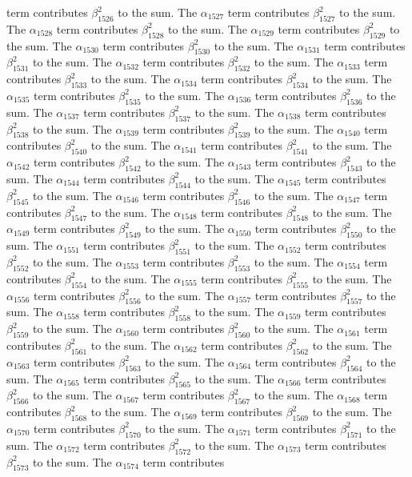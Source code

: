 \begin{lemma}
term contributes $\beta_{1526}^{2}$ to the sum. The $\alpha_{1527}$ term contributes $\beta_{1527}^{2}$ to the sum. The $\alpha_{1528}$ term contributes $\beta_{1528}^{2}$ to the sum. The $\alpha_{1529}$ term contributes $\beta_{1529}^{2}$ to the sum. The $\alpha_{1530}$ term contributes $\beta_{1530}^{2}$ to the sum. The $\alpha_{1531}$ term contributes $\beta_{1531}^{2}$ to the sum. The $\alpha_{1532}$ term contributes $\beta_{1532}^{2}$ to the sum. The $\alpha_{1533}$ term contributes $\beta_{1533}^{2}$ to the sum. The $\alpha_{1534}$ term contributes $\beta_{1534}^{2}$ to the sum. The $\alpha_{1535}$ term contributes $\beta_{1535}^{2}$ to the sum. The $\alpha_{1536}$ term contributes $\beta_{1536}^{2}$ to the sum. The $\alpha_{1537}$ term contributes $\beta_{1537}^{2}$ to the sum. The $\alpha_{1538}$ term contributes $\beta_{1538}^{2}$ to the sum. The $\alpha_{1539}$ term contributes $\beta_{1539}^{2}$ to the sum. The $\alpha_{1540}$ term contributes $\beta_{1540}^{2}$ to the sum. The $\alpha_{1541}$ term contributes $\beta_{1541}^{2}$ to the sum. The $\alpha_{1542}$ term contributes $\beta_{1542}^{2}$ to the sum. The $\alpha_{1543}$ term contributes $\beta_{1543}^{2}$ to the sum. The $\alpha_{1544}$ term contributes $\beta_{1544}^{2}$ to the sum. The $\alpha_{1545}$ term contributes $\beta_{1545}^{2}$ to the sum. The $\alpha_{1546}$ term contributes $\beta_{1546}^{2}$ to the sum. The $\alpha_{1547}$ term contributes $\beta_{1547}^{2}$ to the sum. The $\alpha_{1548}$ term contributes $\beta_{1548}^{2}$ to the sum. The $\alpha_{1549}$ term contributes $\beta_{1549}^{2}$ to the sum. The $\alpha_{1550}$ term contributes $\beta_{1550}^{2}$ to the sum. The $\alpha_{1551}$ term contributes $\beta_{1551}^{2}$ to the sum. The $\alpha_{1552}$ term contributes $\beta_{1552}^{2}$ to the sum. The $\alpha_{1553}$ term contributes $\beta_{1553}^{2}$ to the sum. The $\alpha_{1554}$ term contributes $\beta_{1554}^{2}$ to the sum. The $\alpha_{1555}$ term contributes $\beta_{1555}^{2}$ to the sum. The $\alpha_{1556}$ term contributes $\beta_{1556}^{2}$ to the sum. The $\alpha_{1557}$ term contributes $\beta_{1557}^{2}$ to the sum. The $\alpha_{1558}$ term contributes $\beta_{1558}^{2}$ to the sum. The $\alpha_{1559}$ term contributes $\beta_{1559}^{2}$ to the sum. The $\alpha_{1560}$ term contributes $\beta_{1560}^{2}$ to the sum. The $\alpha_{1561}$ term contributes $\beta_{1561}^{2}$ to the sum. The $\alpha_{1562}$ term contributes $\beta_{1562}^{2}$ to the sum. The $\alpha_{1563}$ term contributes $\beta_{1563}^{2}$ to the sum. The $\alpha_{1564}$ term contributes $\beta_{1564}^{2}$ to the sum. The $\alpha_{1565}$ term contributes $\beta_{1565}^{2}$ to the sum. The $\alpha_{1566}$ term contributes $\beta_{1566}^{2}$ to the sum. The $\alpha_{1567}$ term contributes $\beta_{1567}^{2}$ to the sum. The $\alpha_{1568}$ term contributes $\beta_{1568}^{2}$ to the sum. The $\alpha_{1569}$ term contributes $\beta_{1569}^{2}$ to the sum. The $\alpha_{1570}$ term contributes $\beta_{1570}^{2}$ to the sum. The $\alpha_{1571}$ term contributes $\beta_{1571}^{2}$ to the sum. The $\alpha_{1572}$ term contributes $\beta_{1572}^{2}$ to the sum. The $\alpha_{1573}$ term contributes $\beta_{1573}^{2}$ to the sum. The $\alpha_{1574}$ term contributes 
\end{lemma}
